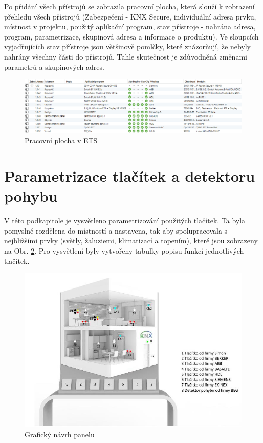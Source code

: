 Po přidání všech přístrojů se zobrazila pracovní plocha, která slouží k zobrazení přehledu všech přístrojů (Zabezpečení - KNX Secure, individuální adresa prvku, místnost v projektu, použitý aplikační program, stav přístroje - nahrána adresa, program, parametrizace, skupinová adresa a informace o produktu). Ve sloupcích vyjadřujících stav přístroje jsou většinově pomlčky, které znázorňují, že nebyly nahrány všechny části do přístrojů. Tahle skutečnost je zdůvodněná změnami parametrů a skupinových adres.

\begin{figure}[!ht]
  \begin{center}
    \includegraphics[scale=0.5]{obrazky/Přístroje v ETS.png}
  \end{center}
  \caption[Pracovní plocha v ETS]{Pracovní plocha v ETS}
  \label{fig:Pracovní plocha v ETS}
\end{figure}

\section{Parametrizace tlačítek a detektoru pohybu}
V této podkapitole je vysvětleno parametrizování použitých tlačítek. Ta byla pomyslně rozdělena do místností a nastavena, tak aby spolupracovala s nejbližšími prvky (světly, žaluziemi, klimatizací a topením), které jsou zobrazeny na Obr. \ref{fig:Vzheled panelu}. Pro vysvětlení byly vytvořeny tabulky popisu funkcí jednotlivých tlačítek. 

\begin{figure}[!h]
  \begin{center}
    \includegraphics[scale=0.7]{obrazky/Panel_vzhled.png}
  \end{center}
  \caption[Grafický návrh panelu \cite{Mitrenga}]{Grafický návrh panelu \cite{Mitrenga}}
  \label{fig:Vzheled panelu}
\end{figure}

